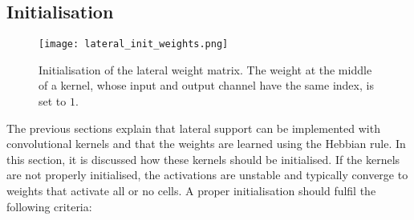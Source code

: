 


\subsection{Initialisation}
\begin{figure}[h]
    \centering
    \texttt{[image: lateral\_init\_weights.png]}
    \caption[Initialisation of the lateral weight matrix]{Initialisation of the lateral weight matrix. The weight at the middle of a kernel, whose input and output channel have the same index, is set to $1$.}
\end{figure}
The previous sections explain that lateral support can be implemented with convolutional kernels and that the weights are learned using the Hebbian rule.
In this section, it is discussed how these kernels should be initialised.
If the kernels are not properly initialised, the activations are unstable and typically converge to weights that activate all or no cells.
A proper initialisation should fulfil the following criteria:

